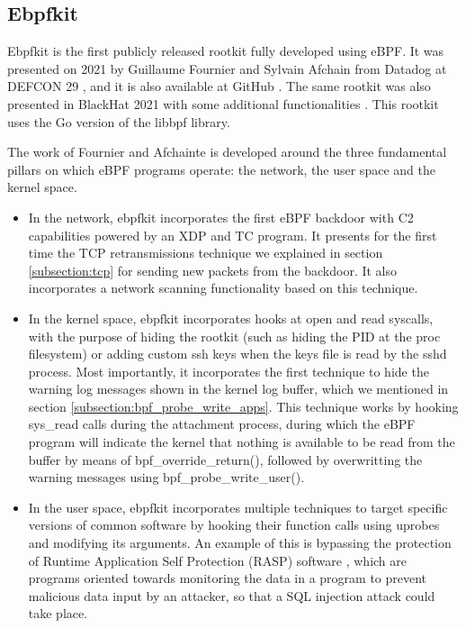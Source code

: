 \subsection{Ebpfkit}
Ebpfkit is the first publicly released rootkit fully developed using eBPF. It was presented on 2021 by Guillaume Fournier and Sylvain Afchain from Datadog at DEFCON 29 \cite{ebpf_friends}, and it is also available at GitHub \cite{ebpf_friends_github}. The same rootkit was also presented in BlackHat 2021 with some additional functionalities \cite{ebpf_friends_blackhat}. This rootkit uses the Go version of the libbpf library.

The work of Fournier and Afchainte is developed around the three fundamental pillars on which eBPF programs operate: the network, the user space and the kernel space.
\begin{itemize}
\item In the network, ebpfkit incorporates the first eBPF backdoor with C2 capabilities powered by an XDP and TC program. It presents for the first time the TCP retransmissions technique we explained in section \ref{subsection:tcp} for sending new packets from the backdoor. It also incorporates a network scanning functionality based on this technique.
\item In the kernel space, ebpfkit incorporates hooks at open and read syscalls, with the purpose of hiding the rootkit (such as hiding the PID at the proc filesystem) or adding custom ssh keys when the keys file is read by the sshd process. Most importantly, it incorporates the first technique to hide the warning log messages shown in the kernel log buffer, which we mentioned in section \ref{subsection:bpf_probe_write_apps}. This technique works by hooking sys\_read calls during the attachment process, during which the eBPF program will indicate the kernel that nothing is available to be read from the buffer by means of bpf\_override\_return(), followed by overwritting the warning messages using bpf\_probe\_write\_user().
\item In the user space, ebpfkit incorporates multiple techniques to target specific versions of common software by hooking their function calls using uprobes and modifying its arguments. An example of this is bypassing the protection of Runtime Application Self Protection (RASP) software \cite{rasps}, which are programs oriented towards monitoring the data in a program to prevent malicious data input by an attacker, so that a SQL injection attack \cite{sql_injection} could take place.
\end{itemize}

